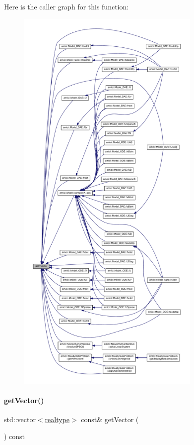 Here is the caller graph for this function\+:
\nopagebreak
\begin{figure}[H]
\begin{center}
\leavevmode
\includegraphics[height=550pt]{classamici_1_1_ami_vector_acf288b105b2fa4520d0d73f828687533_icgraph}
\end{center}
\end{figure}
\mbox{\label{classamici_1_1_ami_vector_a5f73cf1c7b6769c44dfb51b048ec4d63}} 
\paragraph{\texorpdfstring{get\+Vector()}{getVector()}}
{\footnotesize\ttfamily std\+::vector$<$\mbox{\hyperlink{namespaceamici_a1bdce28051d6a53868f7ccbf5f2c14a3}{realtype}}$>$ const\& get\+Vector (\begin{DoxyParamCaption}{ }\end{DoxyParamCaption}) const}

